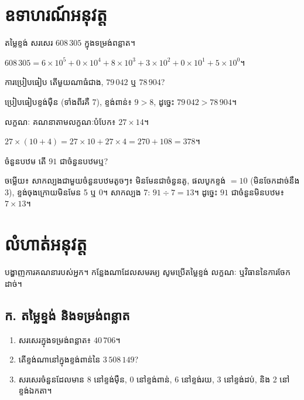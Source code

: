 \section{ឧទាហរណ៍អនុវត្ត}

\begin{example}{តម្លៃខ្ទង់}
សរសេរ $608\,305$ ក្នុងទម្រង់ពន្លាត។
\begin{solution}
$608\,305 = 6\times10^5 + 0\times10^4 + 8\times10^3 + 3\times10^2 + 0\times10^1 + 5\times10^0$។
\end{solution}
\end{example}

\begin{example}{ការប្រៀបធៀប}
តើមួយណាធំជាង, $79\,042$ ឬ $78\,904$?
\begin{solution}
ប្រៀបធៀបខ្ទង់ម៉ឺន (ទាំងពីរគឺ 7), ខ្ទង់ពាន់៖ $9>8$, ដូច្នេះ $79\,042>78\,904$។
\end{solution}
\end{example}

\begin{example}{លក្ខណៈ}
គណនាតាមលក្ខណៈបំបែក៖ $27\times 14$។
\begin{solution}
$27\times(10+4)=27\times10+27\times4=270+108=378$។
\end{solution}
\end{example}

\begin{example}{ចំនួនបឋម}
    តើ $91$ ជាចំនួនបឋមឬ?
    \begin{solution}
    ចម្លើយ៖ សាកល្បងជាមួយចំនួនបឋមតូចៗ៖ មិនមែនជាចំនួនគូ, ផលបូកខ្ទង់ $=10$ (មិនចែកដាច់នឹង 3), ខ្ទង់ចុងក្រោយមិនមែន 5 ឬ 0។ សាកល្បង 7: $91\div7=13$។ ដូច្នេះ $91$ ជាចំនួនមិនបឋម៖ $7\times13$។
    \end{solution}
\end{example}

    \section{លំហាត់អនុវត្ត}
    បង្ហាញការគណនារបស់អ្នក។ កន្លែងណាដែលសមរម្យ សូមប្រើតម្លៃខ្ទង់ លក្ខណៈ ឬវិធាននៃការចែកដាច់។

    \subsection*{ក. តម្លៃខ្ទង់ និងទម្រង់ពន្លាត}
    \begin{enumerate}[label=\arabic*.]
        \item សរសេរក្នុងទម្រង់ពន្លាត៖ $40\,706$។
        \item តើខ្ទង់ណានៅក្នុងខ្ទង់ពាន់នៃ $3\,508\,149$?
        \item សរសេរចំនួនដែលមាន 8 នៅខ្ទង់ម៉ឺន, 0 នៅខ្ទង់ពាន់, 6 នៅខ្ទង់រយ, 3 នៅខ្ទង់ដប់, និង 2 នៅខ្ទង់ឯកតា។
    \end{enumerate}

